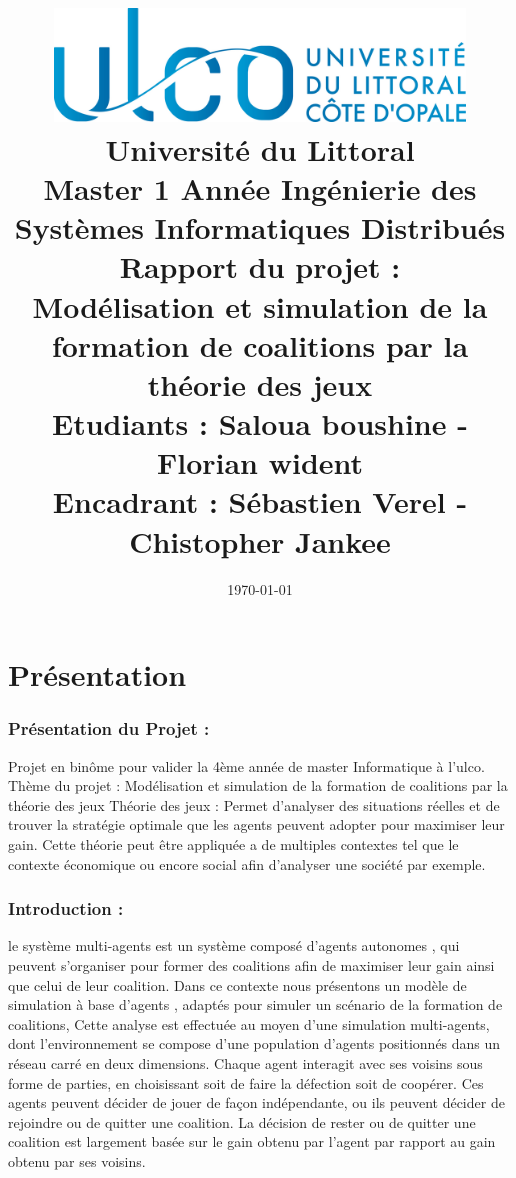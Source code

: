 \documentclass[30pt]{report}
\title{\includegraphics[width=12cm,height=30mm]{logo.jpg} \\ \vspace{15 mm} Université du Littoral \\ Master 1\up{ère} Année Ingénierie des Systèmes Informatiques Distribués \\ \vspace{15 mm} Rapport du projet : \\ Modélisation et simulation de la formation de coalitions par la théorie des jeux \\ \vspace{10 mm} Etudiants : Saloua boushine - Florian wident\\ Encadrant : Sébastien Verel - Chistopher Jankee }
\date{\today}
\begin{document}
\maketitle

\renewcommand{\contentsname}{Sommaire}
\tableofcontents
\part{Présentation}
\section{Présentation du Projet  :}
Projet en binôme pour valider la 4ème année de master Informatique à l'ulco.
\newline
\newline
 Thème du projet : Modélisation et simulation de la formation de coalitions par la théorie des jeux
\newline
\newline
Théorie des jeux : Permet d'analyser des situations réelles et de trouver la stratégie optimale que les agents peuvent adopter pour maximiser leur gain.
Cette théorie peut être appliquée a de multiples contextes tel que le contexte économique ou encore social afin d'analyser une société par exemple.
\newline

\section{Introduction  :}
	le système multi-agents est un système composé d'agents autonomes , qui peuvent s'organiser pour former des coalitions afin de maximiser leur gain ainsi que celui de leur coalition. 
	\newline
	\newline
	Dans ce contexte nous présentons un modèle de simulation à base d'agents , adaptés pour simuler un scénario de la formation de coalitions, Cette analyse est effectuée au moyen d'une simulation multi-agents, dont l'environnement se compose d'une population d'agents positionnés dans un réseau carré en deux dimensions. 
	\newline
	\newline
	 Chaque agent interagit avec ses voisins sous forme de parties, en choisissant soit  de faire la défection soit de coopérer. Ces agents peuvent décider de jouer de façon indépendante, ou ils peuvent décider de rejoindre ou de quitter une coalition. 
	 \newline
	 \newline
	La décision de rester ou de quitter une coalition est largement basée sur le gain obtenu par l'agent par rapport au gain obtenu par ses voisins.
	\newline
\end{document}

